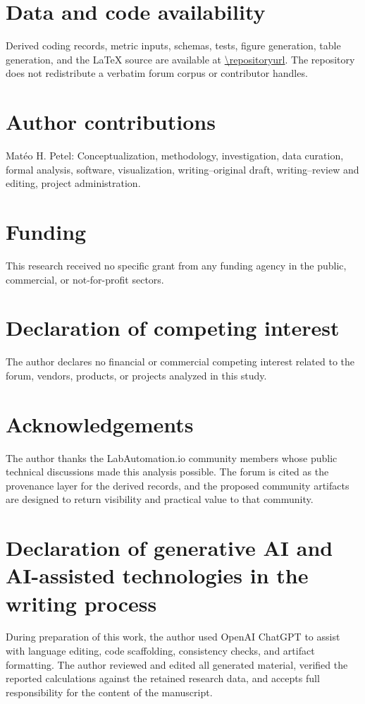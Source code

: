 \section*{Data and code availability}
Derived coding records, metric inputs, schemas, tests, figure generation, table generation, and the LaTeX source are available at \url{\repositoryurl}. The repository does not redistribute a verbatim forum corpus or contributor handles.

\section*{Author contributions}
Mat\'eo H. Petel: Conceptualization, methodology, investigation, data curation, formal analysis, software, visualization, writing--original draft, writing--review and editing, project administration.

\section*{Funding}
This research received no specific grant from any funding agency in the public, commercial, or not-for-profit sectors.

\section*{Declaration of competing interest}
The author declares no financial or commercial competing interest related to the forum, vendors, products, or projects analyzed in this study.

\section*{Acknowledgements}
The author thanks the LabAutomation.io community members whose public technical discussions made this analysis possible. The forum is cited as the provenance layer for the derived records, and the proposed community artifacts are designed to return visibility and practical value to that community.

\section*{Declaration of generative AI and AI-assisted technologies in the writing process}
During preparation of this work, the author used OpenAI ChatGPT to assist with language editing, code scaffolding, consistency checks, and artifact formatting. The author reviewed and edited all generated material, verified the reported calculations against the retained research data, and accepts full responsibility for the content of the manuscript.

